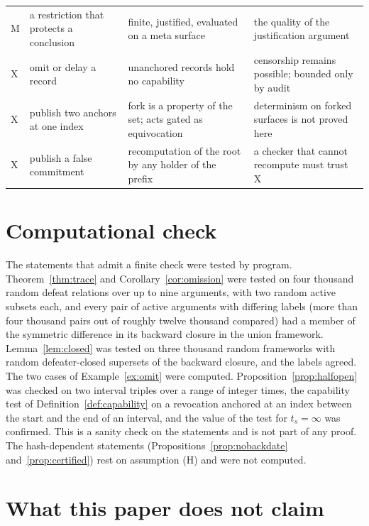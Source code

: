 \documentclass[11pt]{article}
\theoremstyle{plain}
\theoremstyle{definition}
\theoremstyle{remark}
\begin{document}
{\begin{longtable}{@{}l >{\raggedright\arraybackslash}p{} >{\raggedright\arraybackslash}p{} >{\raggedright\arraybackslash}p{}@{}}
M & a restriction that protects a conclusion & finite, justified, evaluated on a meta surface & the quality of the justification argument\\
X & omit or delay a record & unanchored records hold no capability & censorship remains possible; bounded only by audit\\
X & publish two anchors at one index & fork is a property of the set; acts gated as equivocation & determinism on forked surfaces is not proved here\\
X & publish a false commitment & recomputation of the root by any holder of the prefix & a checker that cannot recompute must trust X\\
\bottomrule
\end{longtable}}


\section{Computational check}\label{sec:check}

The statements that admit a finite check were tested by program. Theorem~\ref{thm:trace} and Corollary~\ref{cor:omission} were tested on four thousand random defeat relations over up to nine arguments, with two random active subsets each, and every pair of active arguments with differing labels (more than four thousand pairs out of roughly twelve thousand compared) had a member of the symmetric difference in its backward closure in the union framework. Lemma~\ref{lem:closed} was tested on three thousand random frameworks with random defeater-closed supersets of the backward closure, and the labels agreed. The two cases of Example~\ref{ex:omit} were computed. Proposition~\ref{prop:halfopen} was checked on two interval triples over a range of integer times, the capability test of Definition~\ref{def:capability} on a revocation anchored at an index between the start and the end of an interval, and the value of the test for $t_s=\infty$ was confirmed. This is a sanity check on the statements and is not part of any proof. The hash-dependent statements (Propositions~\ref{prop:nobackdate} and~\ref{prop:certified}) rest on assumption (H) and were not computed.

\section{What this paper does not claim}\label{sec:claims}
\end{document}
